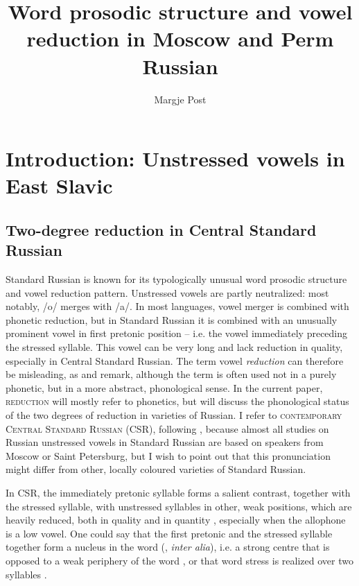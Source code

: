 \documentclass[output=paper,colorlinks,citecolor=black]{langscibook}
\author{Margje Post\orcid{0000-0003-3959-5905}\affiliation{University of Bergen}}
\title{Word prosodic structure and vowel reduction in Moscow and Perm Russian}
\begin{document}
\maketitle

%

\section{Introduction: Unstressed vowels in East Slavic} 
\subsection{Two-degree reduction in Central Standard Russian}

Standard Russian is known for its typologically unusual word prosodic structure and vowel reduction pattern. Unstressed vowels are partly neutralized: most notably, /o/ merges with /a/. In most languages, vowel merger is combined with phonetic reduction, but in Standard Russian it is combined with an unusually prominent vowel in first pretonic position -- i.e. the vowel immediately preceding the stressed syllable. This vowel can be very long and lack reduction in quality, especially in Central Standard Russian. The term vowel \textit{reduction} can therefore be misleading, as \citet{Dubina2012} and \citet{Iosad2012} remark, although the term is often used not in a purely phonetic, but in a more abstract, phonological sense. In the current paper, \textsc{reduction} will mostly refer to phonetics, but  will discuss the phonological status of the two degrees of reduction in varieties of Russian. I refer to \textsc{contemporary Central Standard Russian} (CSR), following \citet{Iosad2012}, because almost all studies on Russian unstressed vowels in Standard Russian are based on speakers from Moscow or Saint Petersburg, but I wish to point out that this pronunciation might differ from other, locally coloured varieties of Standard Russian.

In CSR, the immediately pretonic syllable forms a salient contrast, together with the stressed syllable, with unstressed syllables in other, weak positions, which are heavily reduced, both in quality and in quantity \citep{Zlatoustova1981,Kodzasov1999}, especially when the allophone is a low vowel. One could say that the first pretonic and the stressed syllable together form a nucleus in the word (\citealt{Kodzasov1999}, \textit{inter alia}), i.e. a strong centre that is opposed to a weak periphery of the word \citep{Kasatkina1996}, or that word stress is realized over two syllables \citep[cf.][xiii]{Dubina2012}. 
\end{document}
